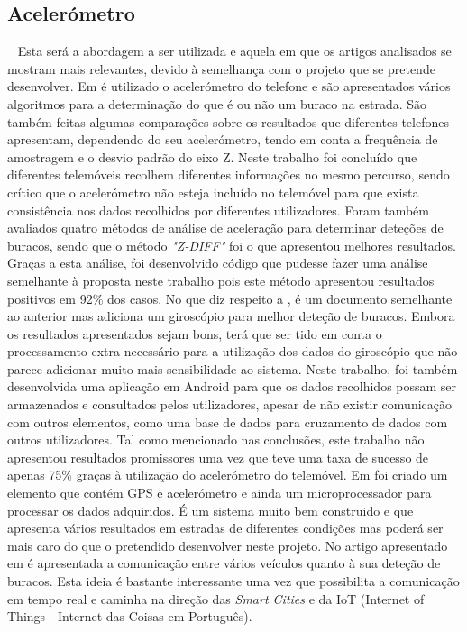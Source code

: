 \subsection{Acelerómetro}\
\label{subsec: acelerometro}
Esta será a abordagem a ser utilizada e aquela em que os artigos analisados se mostram mais relevantes, devido à semelhança com o projeto que se pretende desenvolver. Em \cite{Mednis2011} é utilizado o acelerómetro do telefone e são apresentados vários algoritmos para a determinação do que é ou não um buraco na estrada. São também feitas algumas comparações sobre os resultados que diferentes telefones apresentam, dependendo do seu acelerómetro, tendo em conta a frequência de amostragem e o desvio padrão do eixo Z.
Neste trabalho foi concluído que diferentes telemóveis recolhem diferentes informações no mesmo percurso, sendo crítico que o acelerómetro não esteja incluído no telemóvel para que exista consistência nos dados recolhidos por diferentes utilizadores.
Foram também avaliados quatro métodos de análise de aceleração para determinar deteções de buracos, sendo que o método \emph{"Z-DIFF"} foi o que apresentou melhores resultados.
Graças a esta análise, foi desenvolvido código que pudesse fazer uma análise semelhante à proposta neste trabalho pois este método apresentou resultados positivos em 92\% dos casos.
No que diz respeito a \cite{Fouad}, é um documento semelhante ao anterior mas adiciona um giroscópio para melhor deteção de buracos. Embora os resultados apresentados sejam bons, terá que ser tido em conta o processamento extra necessário para a utilização dos dados do giroscópio que não parece adicionar muito mais sensibilidade ao sistema.
Neste trabalho, foi também desenvolvida uma aplicação em Android para que os dados recolhidos possam ser armazenados e consultados pelos utilizadores, apesar de não existir comunicação com outros elementos, como uma base de dados para cruzamento de dados com outros utilizadores.
Tal como mencionado nas conclusões, este trabalho não apresentou resultados promissores uma vez que teve uma taxa de sucesso de apenas 75\% graças à utilização do acelerómetro do telemóvel.
Em \cite{Chen2011} foi criado um elemento que contém GPS e acelerómetro e ainda um microprocessador para processar os dados adquiridos. É um sistema muito bem construido e que apresenta vários resultados em estradas de diferentes condições mas poderá ser mais caro do que o pretendido desenvolver neste projeto. No artigo apresentado em \cite{Jang} é apresentada a comunicação entre vários veículos quanto à sua deteção de buracos. Esta ideia é bastante interessante uma vez que possibilita a comunicação em tempo real e caminha na direção das \emph{Smart Cities} e da IoT (Internet of Things - Internet das Coisas em Português).

